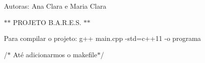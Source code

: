 Autoras\+: Ana Clara e Maria Clara

$\ast$$\ast$ P\+R\+O\+J\+E\+T\+O B.\+A.\+R.\+E.\+S. $\ast$$\ast$

Para compilar o projeto\+: g++ main.\+cpp -\/std=c++11 -\/o programa

/$\ast$ Até adicionarmos o makefile$\ast$/ 